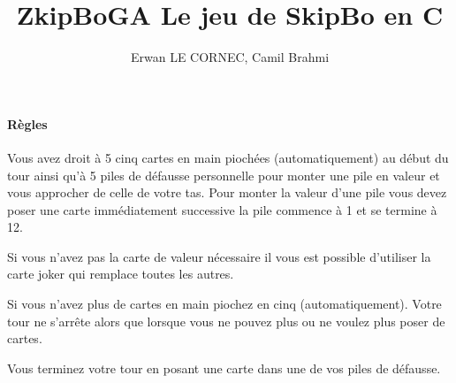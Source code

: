 \documentclass[10pt,a4paper]{article}
\title{\textbf{ZkipBoGA} Le jeu de SkipBo en C}
\author{Erwan LE CORNEC, Camil Brahmi}
\date{}
\begin{document}
\maketitle
\newpage
\paragraph{Règles}

Vous avez droit à 5 cinq cartes en main piochées (automatiquement) au début du tour ainsi qu'à 5 piles de défausse personnelle pour monter une pile en valeur et vous approcher de celle de votre tas.
Pour monter la valeur d'une pile vous devez poser une carte immédiatement successive la pile commence  à 1 et se termine à 12.

Si vous n'avez pas la carte de valeur nécessaire il vous est possible d'utiliser la carte joker qui remplace toutes les autres.

Si vous n'avez plus de cartes en main piochez en cinq (automatiquement).
Votre tour ne s'arrête alors que lorsque vous ne pouvez plus ou ne voulez plus poser de cartes.

Vous terminez votre tour en posant une carte dans une de vos piles de défausse.
\end{document}
